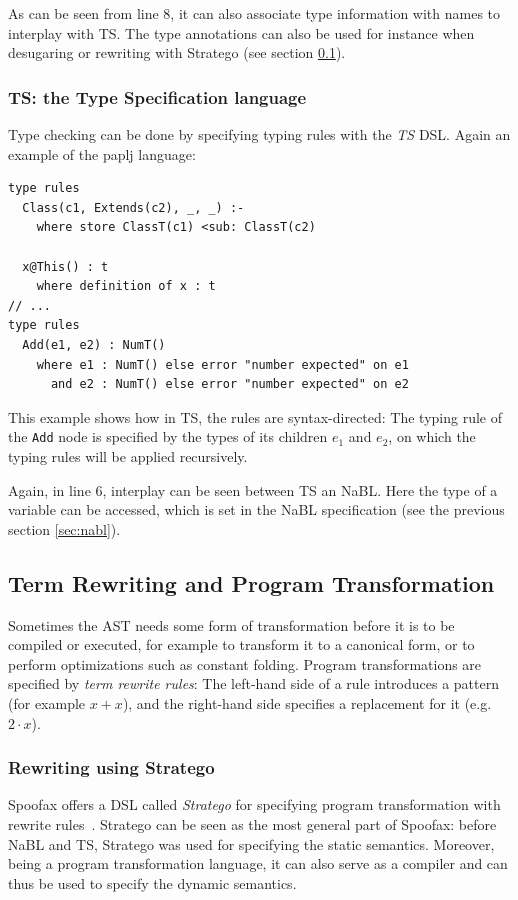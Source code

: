 As can be seen from line 8, it can also associate type information
with names to interplay with TS. The type annotations can also be used
for instance when desugaring or rewriting with Stratego (see section
\ref{sec:term-rewrite}).
\subsubsection{TS: the Type Specification language}
\label{sec:orgheadline4}
Type checking can be done by specifying typing rules with the \emph{TS}
DSL. Again an example of the paplj language:
\lstset{language=type-spec,numbers=left}
\begin{lstlisting}
type rules
  Class(c1, Extends(c2), _, _) :-
    where store ClassT(c1) <sub: ClassT(c2)

  x@This() : t
    where definition of x : t
// ...
type rules
  Add(e1, e2) : NumT()
    where e1 : NumT() else error "number expected" on e1
      and e2 : NumT() else error "number expected" on e2
\end{lstlisting}
This example shows how in TS, the rules are syntax-directed: The
typing rule of the \texttt{Add} node is specified by the types of its
children \(e_1\) and \(e_2\), on which the typing rules will be applied
recursively.

Again, in line 6, interplay can be seen between TS an NaBL. Here the
type of a variable can be accessed, which is set in the NaBL
specification (see the previous section \ref{sec:nabl}).
\subsection{Term Rewriting and Program Transformation}
\label{sec:term-rewrite}
Sometimes the AST needs some form of transformation before it is to be
compiled or executed, for example to transform it to a canonical form,
or to perform optimizations such as constant folding. Program
transformations are specified by \emph{term rewrite rules}: The left-hand
side of a rule introduces a pattern (for example \(x + x\)), and the
right-hand side specifies a replacement for it (e.g. \(2\cdot x\)).
\subsubsection{Rewriting using Stratego}
\label{sec:orgheadline5}
Spoofax offers a DSL called \emph{Stratego} for specifying program
transformation with rewrite rules~\cite{Visser01}. Stratego can be
seen as the most general part of Spoofax: before NaBL and TS, Stratego
was used for specifying the static semantics. Moreover, being a
program transformation language, it can also serve as a compiler and
can thus be used to specify the dynamic semantics.

